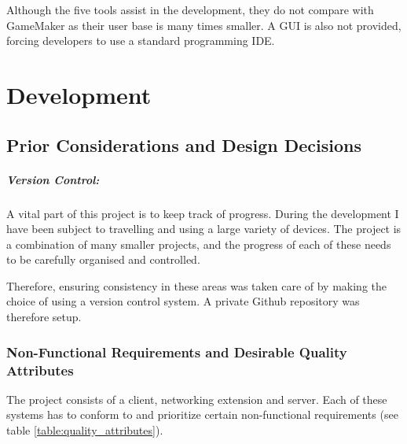 \documentclass[bsc,frontabs,twoside,singlespacing,parskip,deptreport]{infthesis}     %
\begin{document}
Although the five tools assist in the development, they do not compare with GameMaker as their user base is many times smaller. A GUI is also not provided, forcing developers to use a standard programming IDE.


\chapter{Development}

\section{Prior Considerations and Design Decisions}

\paragraph*{Version Control:}
A vital part of this project is to keep track of progress. During the development I have been subject to travelling and using a large variety of devices. The project is a combination of many smaller projects, and the progress of each of these needs to be carefully organised and controlled.

Therefore, ensuring consistency in these areas was taken care of by making the choice of using a version control system. A private Github \cite{github} repository was therefore setup.

\subsection{Non-Functional Requirements and Desirable Quality Attributes}
The project consists of a client, networking extension and server. Each of these systems has to conform to and prioritize certain non-functional requirements (see table \ref{table:quality_attributes}).
\end{document}
